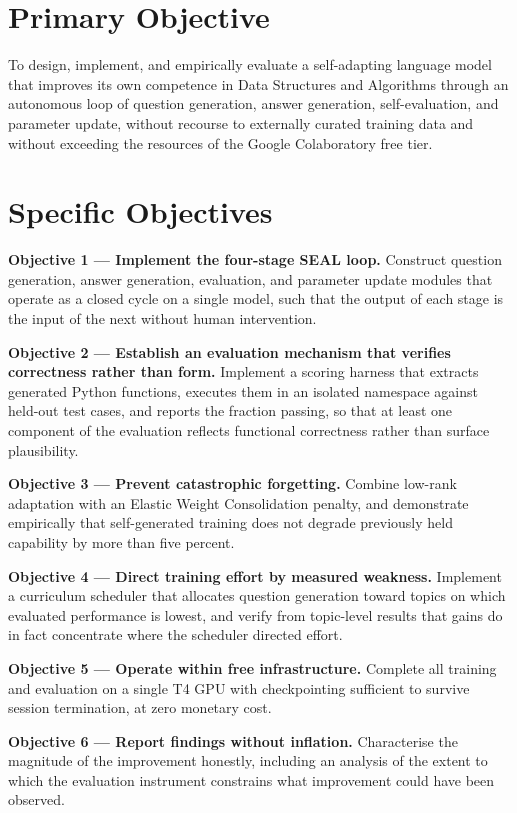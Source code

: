 \documentclass[12pt,a4paper]{report}
\begin{document}
\section{Primary Objective}

To design, implement, and empirically evaluate a self-adapting language model that improves its own competence in Data Structures and Algorithms through an autonomous loop of question generation, answer generation, self-evaluation, and parameter update, without recourse to externally curated training data and without exceeding the resources of the Google Colaboratory free tier.

\section{Specific Objectives}

\textbf{Objective 1 --- Implement the four-stage SEAL loop.} Construct question generation, answer generation, evaluation, and parameter update modules that operate as a closed cycle on a single model, such that the output of each stage is the input of the next without human intervention.

\textbf{Objective 2 --- Establish an evaluation mechanism that verifies correctness rather than form.} Implement a scoring harness that extracts generated Python functions, executes them in an isolated namespace against held-out test cases, and reports the fraction passing, so that at least one component of the evaluation reflects functional correctness rather than surface plausibility.

\textbf{Objective 3 --- Prevent catastrophic forgetting.} Combine low-rank adaptation with an Elastic Weight Consolidation penalty, and demonstrate empirically that self-generated training does not degrade previously held capability by more than five percent.

\textbf{Objective 4 --- Direct training effort by measured weakness.} Implement a curriculum scheduler that allocates question generation toward topics on which evaluated performance is lowest, and verify from topic-level results that gains do in fact concentrate where the scheduler directed effort.

\textbf{Objective 5 --- Operate within free infrastructure.} Complete all training and evaluation on a single T4 GPU with checkpointing sufficient to survive session termination, at zero monetary cost.

\textbf{Objective 6 --- Report findings without inflation.} Characterise the magnitude of the improvement honestly, including an analysis of the extent to which the evaluation instrument constrains what improvement could have been observed.
\end{document}
